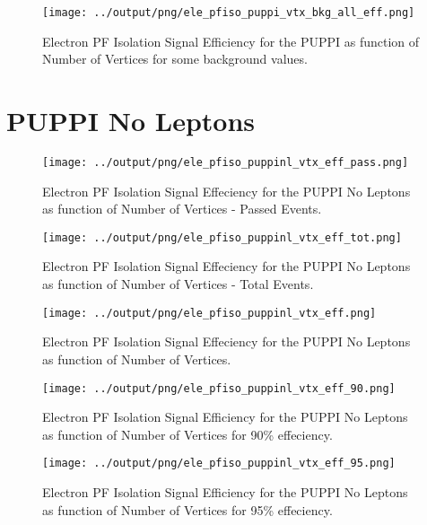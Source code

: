 \documentclass[11pt]{book}
\begin{document}
\begin{figure}[htb]
\centering
\texttt{[image: ../output/png/ele\_pfiso\_puppi\_vtx\_bkg\_all\_eff.png]}
\caption{Electron PF Isolation Signal Efficiency for the PUPPI as function of Number of Vertices for some background values.}
\label{fig:ele_pfiso_vtx_eff_puppi_bkg_all_eff}
\end{figure}
\clearpage

\section{PUPPI No Leptons}
\begin{figure}[htb]
\centering
\texttt{[image: ../output/png/ele\_pfiso\_puppinl\_vtx\_eff\_pass.png]}
\caption{Electron PF Isolation Signal Effeciency for the PUPPI No Leptons as function of Number of Vertices - Passed Events.}
\label{fig:ele_pfiso_vtx_eff_puppinl_pass}
\end{figure}

\begin{figure}[htb]
\centering
\texttt{[image: ../output/png/ele\_pfiso\_puppinl\_vtx\_eff\_tot.png]}
\caption{Electron PF Isolation Signal Effeciency for the PUPPI No Leptons as function of Number of Vertices - Total Events.}
\label{fig:ele_pfiso_vtx_eff_puppinl_tot}
\end{figure}

\begin{figure}[htb]
\centering
\texttt{[image: ../output/png/ele\_pfiso\_puppinl\_vtx\_eff.png]}
\caption{Electron PF Isolation Signal Effeciency for the PUPPI No Leptons as function of Number of Vertices.}
\label{fig:ele_pfiso_vtx_eff_puppinl}
\end{figure}

\begin{figure}[htb]
\centering
\texttt{[image: ../output/png/ele\_pfiso\_puppinl\_vtx\_eff\_90.png]}
\caption{Electron PF Isolation Signal Efficiency for the PUPPI No Leptons as function of Number of Vertices for 90\% effeciency.}
\label{fig:ele_pfiso_vtx_eff_puppinl_eff_90}
\end{figure}

\begin{figure}[htb]
\centering
\texttt{[image: ../output/png/ele\_pfiso\_puppinl\_vtx\_eff\_95.png]}
\caption{Electron PF Isolation Signal Efficiency for the PUPPI No Leptons as function of Number of Vertices for 95\% effeciency.}
\label{fig:ele_pfiso_vtx_eff_puppinl_eff_95}
\end{figure}
\end{document}
